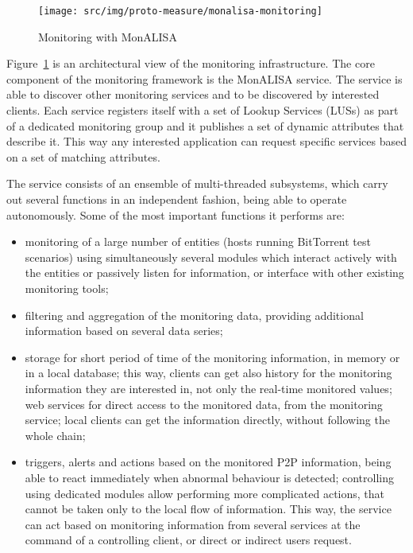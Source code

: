 \begin{figure}[h]
  \begin{center}
    \texttt{[image: src/img/proto-measure/monalisa-monitoring]}
  \end{center}
  \caption{Monitoring with MonALISA}
  \label{fig:proto-measure:monitoring}
\end{figure}

Figure~\ref{fig:proto-measure:monitoring} is an architectural view of the
monitoring infrastructure. The core component of the monitoring framework is
the MonALISA service. The service is able to discover other monitoring
services and to be discovered by interested clients. Each service registers
itself with a set of Lookup Services (LUSs) as part of a dedicated monitoring
group and it publishes a set of dynamic attributes that describe it. This way
any interested application can request specific services based on a set of
matching attributes.

The service consists of an ensemble of multi-threaded subsystems,
which carry out several functions in an independent fashion, being able to
operate autonomously. Some of the most important functions it
performs are:

\begin{itemize}
  \item monitoring of a large number of entities (hosts running BitTorrent
  test scenarios) using simultaneously several modules which interact actively
  with the entities or passively listen for information, or interface with
  other existing monitoring tools;
  \item filtering and aggregation of the monitoring data, providing additional
  information based on several data series;
  \item storage for short period of time of the monitoring information, in
  memory or in a local database; this way, clients can get also history for
  the monitoring information they are interested in, not only the real-time
  monitored values; web services for direct access to the monitored data, from
  the monitoring service; local clients can get the information directly,
  without following the whole chain;
  \item triggers, alerts and actions based on the monitored P2P information,
  being able to react immediately when abnormal behaviour is detected;
  controlling using dedicated modules allow performing more complicated
  actions, that cannot be taken only to the local flow of information. This
  way, the service can act based on monitoring information from several
  services at the command of a controlling client, or direct or indirect users
  request.
\end{itemize}

